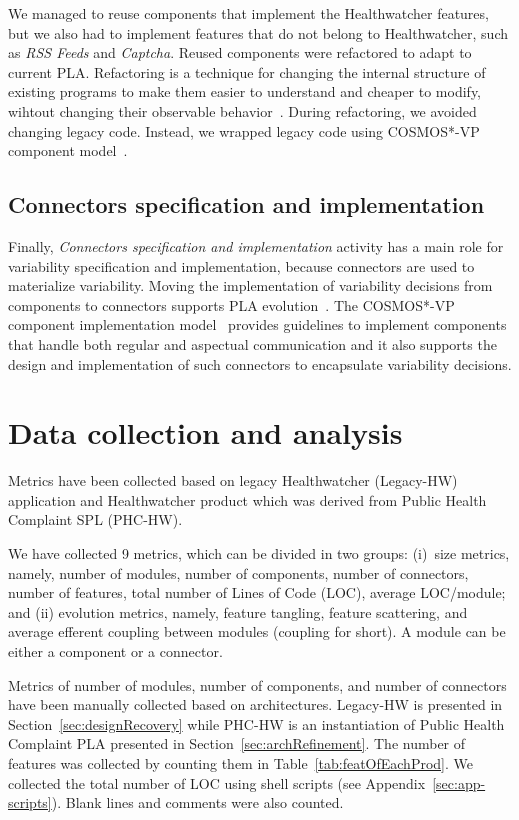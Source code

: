\documentclass[11pt,twoside]{article}
\begin{document}
We managed to reuse components that implement the Healthwatcher features, but we also had to implement features that do not belong to
Healthwatcher, such as \textit{RSS Feeds} and \textit{Captcha}. Reused components were refactored to adapt to current PLA. Refactoring is a technique
for changing the internal structure of existing programs to make them easier to understand and cheaper to
modify, wihtout changing their observable behavior~\cite{Fowler:1999:RID}. During refactoring, we avoided changing legacy code. Instead, we wrapped
legacy code using COSMOS*-VP component model~\cite{Dias:2010:LAC}.


\subsection{Connectors specification and implementation}
Finally, \textit{Connectors specification and implementation} activity has a main role for variability specification and implementation, because
connectors are used to materialize
variability. Moving the implementation of variability decisions from components to connectors supports PLA evolution~\cite{Tizzei:2011:ECSA}. The
COSMOS*-VP component implementation model~\cite{Dias:2010:LAC} provides guidelines to implement components that handle both regular and
aspectual communication and it also supports the design and implementation of such connectors to encapsulate variability decisions. 

\section{Data collection and analysis}

Metrics have been collected  based on legacy Healthwatcher (Legacy-HW) application and Healthwatcher product which was derived from Public Health
Complaint SPL (PHC-HW). 

We have collected 9 metrics, which can be divided in two groups: (i)~size metrics, namely, number of modules, number of components, number of
connectors, number of features, total number of Lines of Code (LOC), average LOC/module; and (ii) evolution metrics, namely, feature tangling, feature
scattering, and average efferent coupling between modules (coupling for short). A module can be either a component or a connector. 

Metrics of number of modules, number of components, and number of connectors have been manually collected based on architectures. Legacy-HW is
presented in Section~\ref{sec:designRecovery} while PHC-HW is an instantiation of Public Health Complaint PLA presented in
Section~\ref{sec:archRefinement}. The number of features was collected by counting them in Table~\ref{tab:featOfEachProd}. We collected the total
number of LOC using shell scripts (see Appendix~\ref{sec:app-scripts}). Blank lines and comments were also counted.
\end{document}
